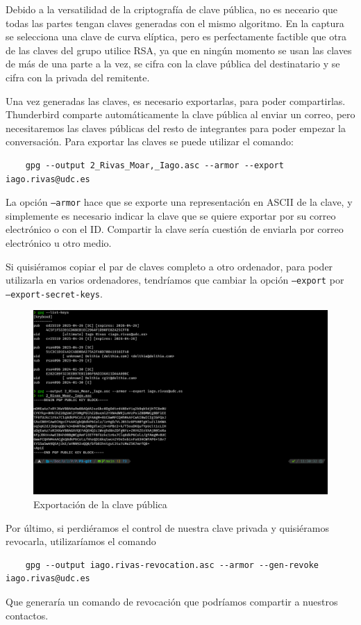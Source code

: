 Debido a la versatilidad de la criptografía de clave pública, no es neceario que todas las partes tengan claves generadas con el mismo algoritmo. En la captura se selecciona una clave de curva elíptica, pero es perfectamente factible que otra de las claves del grupo utilice RSA, ya que en ningún momento se usan las claves de más de una parte a la vez, se cifra con la clave pública del destinatario y se cifra con la privada del remitente.

Una vez generadas las claves, es necesario exportarlas, para poder compartirlas. Thunderbird comparte automáticamente la clave pública al enviar un correo, pero necesitaremos las claves públicas del resto de integrantes para poder empezar la conversación. Para exportar las claves se puede utilizar el comando:

\begin{verbatim}
    gpg --output 2_Rivas_Moar,_Iago.asc --armor --export iago.rivas@udc.es
\end{verbatim}

La opción \texttt{--armor} hace que se exporte una representación en ASCII de la clave, y simplemente es necesario indicar la clave que se quiere exportar por su correo electrónico o con el ID. Compartir la clave sería cuestión de enviarla por correo electrónico u otro medio.

Si quisiéramos copiar el par de claves completo a otro ordenador, para poder utilizarla en varios ordenadores, tendríamos que cambiar la opción \texttt{--export} por \\ \texttt{--export-secret-keys}.

\begin{figure}[H]
    \includegraphics[width=\textwidth]{gpg-export.png}
    \caption{Exportación de la clave pública}
\end{figure}

Por último, si perdiéramos el control de nuestra clave privada y quisiéramos revocarla, utilizaríamos el comando

\begin{verbatim}
    gpg --output iago.rivas-revocation.asc --armor --gen-revoke iago.rivas@udc.es
\end{verbatim}

Que generaría un comando de revocación que podríamos compartir a nuestros contactos.
